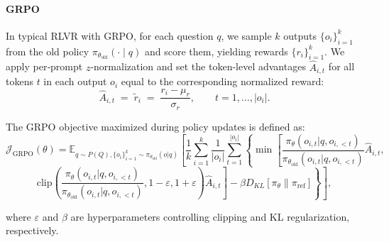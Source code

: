 \documentclass{article}
\begin{document}
\paragraph{GRPO}  %
In typical RLVR with GRPO, for each question \(q\), we sample \(k\) outputs \(\{o_i\}_{i=1}^{k}\) from the old policy \(\pi_{\theta_{\text{old}}}(\cdot\mid q)\) and score them, yielding rewards \(\{r_i\}_{i=1}^{k}\).
We apply per‑prompt \(z\)-normalization and set the token-level advantages $\hat{A}_{i,t}$ for all tokens $t$ in each output $o_i$ equal to the corresponding normalized reward: 
\begin{equation}
\hat A_{i,t} \;=\; \tilde r_i
\;=\; \frac{r_i-\mu_r}{\sigma_r},
\qquad
t = 1,\dots,|o_i|.
\label{eq:z_norm_adv}
\end{equation}


The GRPO objective maximized during policy updates is defined as:
\begin{equation}
\label{eq:grpo_objective}
\mathcal{J}_{\text{GRPO}}(\theta) = \mathbb{E}_{q\sim P(Q), \{o_i\}_{i=1}^{k}\sim\pi_{\theta_{\text{old}}}(o|q)}
\left[
\frac{1}{k}\sum_{i=1}^{k}\frac{1}{|o_i|}\sum_{t=1}^{|o_i|}\left\{
\min\left[\frac{\pi_{\theta}(o_{i,t}|q,o_{i,<t})}{\pi_{\theta_{\text{old}}}(o_{i,t}|q,o_{i,<t})}\hat{A}_{i,t},\right.\right.\right.
\end{equation}
\begin{equation*}    
\left.\left.\left.
\text{clip}\left(\frac{\pi_{\theta}(o_{i,t}|q,o_{i,<t})}{\pi_{\theta_{\text{old}}}(o_{i,t}|q,o_{i,<t})}, 1-\varepsilon, 1+\varepsilon\right)\hat{A}_{i,t}\right]
-\beta D_{KL}\left[\pi_\theta\|\pi_{\text{ref}}\right]\right\}\right],
\end{equation*}


where $\varepsilon$ and $\beta$ are hyperparameters controlling clipping and KL regularization, respectively.
\end{document}
